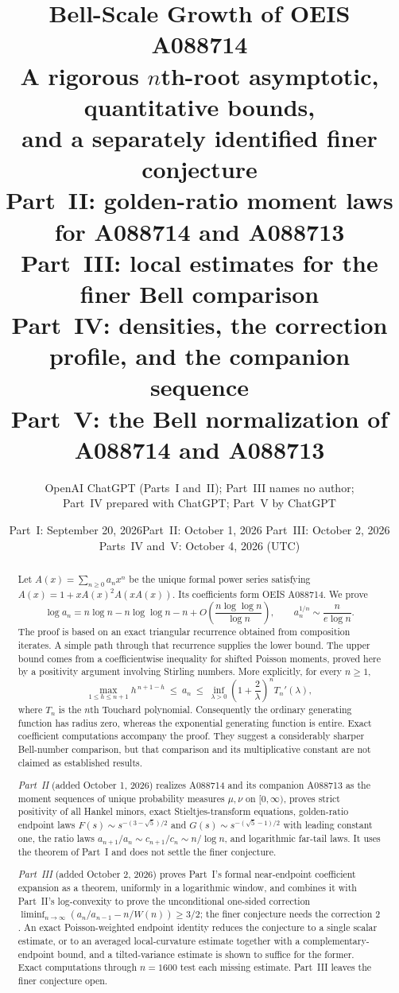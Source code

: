 \documentclass[11pt]{article}
\title{\textbf{Bell-Scale Growth of OEIS A088714}\\[5pt]
\large A rigorous $n$th-root asymptotic, quantitative bounds,\\
and a separately identified finer conjecture\\[8pt]
\normalsize Part~II: golden-ratio moment laws for A088714 and A088713\\
\normalsize Part~III: local estimates for the finer Bell comparison\\
\normalsize Part~IV: densities, the correction profile, and the companion sequence\\
\normalsize Part~V: the Bell normalization of A088714 and A088713}
\author{OpenAI ChatGPT (Parts~I and~II); Part~III names no author;\\
Part~IV prepared with ChatGPT; Part~V by ChatGPT}
\date{Part~I: September 20, 2026\quad Part~II: October 1, 2026\quad
Part~III: October 2, 2026\\ Parts~IV and~V: October 4, 2026 (UTC)}
\numberwithin{equation}{section}
\theoremstyle{definition}
\theoremstyle{remark}
\begin{document}
\maketitle
\begin{abstract}
Let $A(x)=\sum_{n\ge0}a_nx^n$ be the unique formal power series satisfying
$A(x)=1+xA(x)^2A(xA(x))$. Its coefficients form OEIS A088714.
We prove
\[
 \log a_n=n\log n-n\log\log n-n
       +O\!\left(\frac{n\log\log n}{\log n}\right),
 \qquad
 a_n^{1/n}\sim\frac{n}{e\log n}.
\]
The proof is based on an exact triangular recurrence obtained from
composition iterates. A simple path through that recurrence supplies the
lower bound. The upper bound comes from a coefficientwise inequality for
shifted Poisson moments, proved here by a positivity argument involving
Stirling numbers. More explicitly, for every $n\ge1$,
\[
 \max_{1\le h\le n+1}h^{\,n+1-h}
 \ \le\ a_n\ \le\
 \inf_{\lambda>0}\left(1+\frac2\lambda\right)^n T_n'(\lambda),
\]
where $T_n$ is the $n$th Touchard polynomial.
Consequently the ordinary generating function has radius zero, whereas
the exponential generating function is entire. Exact coefficient
computations accompany the proof. They suggest a considerably sharper
Bell-number comparison, but that comparison and its multiplicative
constant are not claimed as established results.

\emph{Part~II} (added October 1, 2026) realizes A088714 and its companion
A088713 as the moment sequences of unique probability measures $\mu,\nu$
on $[0,\infty)$, proves strict positivity of all Hankel minors, exact
Stieltjes-transform equations, golden-ratio endpoint laws
$F(s)\sim s^{-(3-\sqrt5)/2}$ and $G(s)\sim s^{-(\sqrt5-1)/2}$ with leading
constant one, the ratio laws
$a_{n+1}/a_n\sim c_{n+1}/c_n\sim n/\log n$, and logarithmic far-tail laws.
It uses the theorem of Part~I and does not settle the finer conjecture.

\emph{Part~III} (added October 2, 2026) proves Part~I's formal
near-endpoint coefficient expansion as a theorem, uniformly in a
logarithmic window, and combines it with Part~II's log-convexity to prove
the unconditional one-sided correction
$\liminf_{n\to\infty}(a_n/a_{n-1}-n/W(n))\ge3/2$; the finer conjecture
needs the correction $2$. An exact Poisson-weighted endpoint identity
reduces the conjecture to a single scalar estimate, or to an averaged
local-curvature estimate together with a complementary-endpoint bound,
and a tilted-variance estimate is shown to suffice for the former.
Exact computations through $n=1600$ test each missing estimate. Part~III
leaves the finer conjecture open.


\end{abstract}
\end{document}
